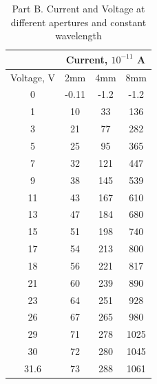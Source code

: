 \documentclass{article}
\begin{document}
 \begin{table}
 \centering
  \caption{Part B. Current and Voltage at different apertures and constant wavelength}
 \begin{tabular}{ | c | c | c | c | }
\hline
    & \multicolumn{3}{c}{Current, $10^{-11}$ A}\\ \hline
	Voltage, V &2mm & 4mm & 8mm \\ \hline
	0 & -0.11 & -1.2 & -1.2 \\ \hline
	1 & 10 & 33 & 136 \\ \hline
	3 & 21 & 77 & 282 \\ \hline
	5 & 25 & 95 & 365 \\ \hline
	7 & 32 & 121 & 447 \\ \hline
	9 & 38 & 145 & 539 \\ \hline
	11 & 43 & 167 & 610 \\ \hline
	13 & 47 & 184 & 680 \\ \hline
	15 & 51 & 198 & 740 \\ \hline
	17 & 54 & 213 & 800 \\ \hline
	18 & 56 & 221 & 817 \\ \hline
	21 & 60 & 239 & 890 \\ \hline
	23 & 64 & 251 & 928 \\ \hline
	26 & 67 & 265 & 980 \\ \hline
	29 & 71 & 278 & 1025 \\ \hline
	30 & 72 & 280 & 1045 \\ \hline
	31.6 & 73 & 288 & 1061 \\ \hline
\end{tabular}
\end{table}
\end{document}
